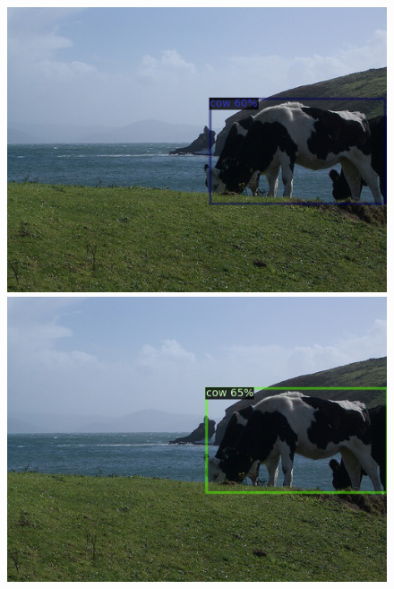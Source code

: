 \documentclass{article}
\begin{document}
\begin{figure}[h!]
  \centering
  \begin{minipage}{0.33\textwidth}
  \includegraphics[width=\textwidth, height=0.17\textheight]{./../../final_results/Pascal/Pascal_1.png}
  \end{minipage}
  \begin{minipage}{0.33\textwidth}
  \includegraphics[width=\textwidth, height=0.17\textheight]{./../../final_results/Pascal/Pascal_5.png}
  \end{minipage}
  \begin{minipage}{0.31\textwidth}

\end{minipage}
\end{figure}
\end{document}
